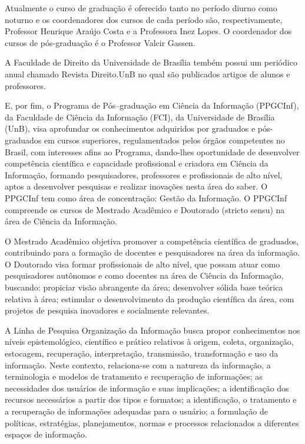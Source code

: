 \documentclass[]{article}
\begin{document}
Atualmente o curso de graduação é oferecido tanto no período diurno como
noturno e os coordenadores dos cursos de cada período são,
respectivamente, Professor Henrique Araújo Costa e a Professora Inez
Lopes. O coordenador dos cursos de pós-graduação é o Professor Valcir
Gassen.

A Faculdade de Direito da Universidade de Brasília tembém possui um
periódico anual chamado Revista Direito.UnB no qual são publicados
artigos de alunos e professores.

E, por fim, o Programa de Pós--graduação em Ciência da Informação
(PPGCInf), da Faculdade de Ciência da Informação (FCI), da Universidade
de Brasília (UnB), visa aprofundar os conhecimentos adquiridos por
graduados e pós-graduados em cursos superiores, regulamentados pelos
órgãos competentes no Brasil, com interesses afins ao Programa,
dando-lhes oportunidade de desenvolver competência científica e
capacidade profissional e criadora em Ciência da Informação, formando
pesquisadores, professores e profissionais de alto nível, aptos a
desenvolver pesquisas e realizar inovações nesta área do saber. O
PPGCInf tem como área de concentração: Gestão da Informação. O PPGCInf
compreende os cursos de Mestrado Acadêmico e Doutorado (stricto sensu)
na área de Ciência da Informação.

O Mestrado Acadêmico objetiva promover a competência científica de
graduados, contribuindo para a formação de docentes e pesquisadores na
área da informação. O Doutorado visa formar profissionais de alto nível,
que possam atuar como pesquisadores autônomos e como docentes na área de
Ciência da Informação, buscando: propiciar visão abrangente da área;
desenvolver sólida base teórica relativa à área; estimular o
desenvolvimento da produção científica da área, com projetos de pesquisa
inovadores e socialmente relevantes.

A Linha de Pesquisa Organização da Informação busca propor conhecimentos
nos níveis epistemológico, científico e prático relativos à origem,
coleta, organização, estocagem, recuperação, interpretação, transmissão,
transformação e uso da informação. Neste contexto, relaciona-se com a
natureza da informação, a terminologia e modelos de tratamento e
recuperação de informações; as necessidades dos usuários de informação e
suas implicações; a identificação dos recursos necessários a partir dos
tipos e formatos; a identificação, o tratamento e a recuperação de
informações adequadas para o usuário; a formulação de políticas,
estratégias, planejamentos, normas e processos relacionados a diferentes
espaços de informação.
\end{document}
